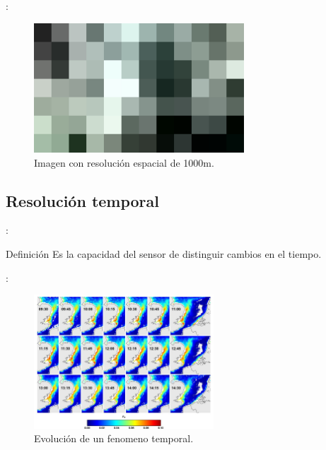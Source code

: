 \documentclass[aspectratio=169]{beamer}
\begin{document}
\begin{frame}{\secname : \subsecname}
    \begin{figure}[h!]
        \centering
        \includegraphics[width=0.7\textwidth]{fig:1000m.jpg}
        \caption{Imagen con resolución espacial de 1000m.}
    \end{figure}
\end{frame}

\subsection{Resolución temporal}

\begin{frame}{\secname : \subsecname}
    \begin{block}{Definición}
        Es la capacidad del sensor de distinguir cambios en el tiempo.
    \end{block}
\end{frame}

\begin{frame}{\secname : \subsecname}
    \begin{figure}[h!]
        \centering
        \includegraphics[width=0.6\textwidth]{fig:restemp.jpg}
        \caption{Evolución de un fenomeno temporal.}
        \label{fig:restemp}
    \end{figure}
\end{frame}
\end{document}
